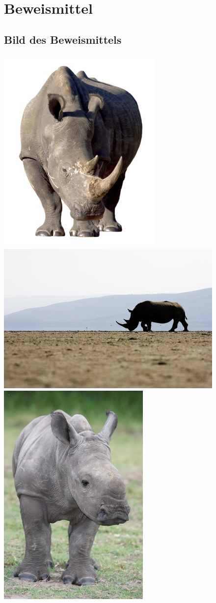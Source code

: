 \chapter{Beweismittel}

\section{Bild des Beweismittels}

\includegraphics[scale=0.6]{bilder/f0000001.jpg }
\includegraphics[scale=0.6]{bilder/remaining.jpg }
\includegraphics[scale=0.6]{bilder/nasohnehorn.png }
